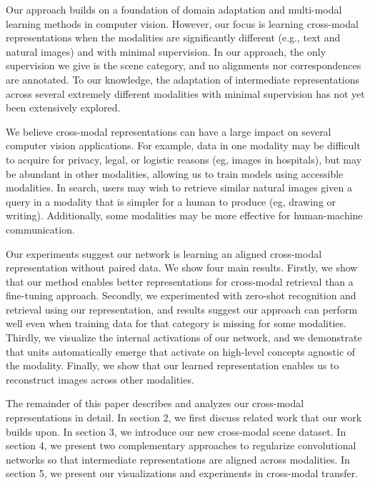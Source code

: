 \documentclass[10pt,journal,compsoc]{IEEEtran}
\begin{document}
    Our approach builds on a foundation of domain adaptation \cite{saenko2010adapting,gopalan2011domain} and multi-modal learning \cite{frome2013devise,norouzi2013zero,socher2013zero} methods in computer vision. However, our focus is learning cross-modal representations when the modalities are significantly different (e.g., text and natural images) and with minimal supervision. In our approach, the only supervision we give is the scene category, and no alignments nor correspondences are annotated. To our knowledge, the adaptation of intermediate representations across several extremely different modalities with minimal supervision has not yet been extensively explored.
    
    We believe cross-modal representations can have a large impact on several computer vision applications.  For example, data in one modality may be difficult to acquire for privacy, legal, or logistic reasons (eg, images in hospitals), but may be abundant in other modalities, allowing us to train models using accessible modalities. In search, users may wish to retrieve similar natural images given a query in a modality that is simpler for a human to produce (eg, drawing or writing). Additionally, some modalities may be more effective for human-machine communication. 
    
    Our experiments suggest our network is learning an aligned cross-modal representation without paired data. We show four main results. Firstly, we show that our method enables better representations for cross-modal retrieval than a fine-tuning approach. Secondly, we experimented with zero-shot recognition and retrieval using our representation, and results suggest our approach can perform well even when training data for that category is missing for some modalities. Thirdly, we visualize the internal activations of our network, and we demonstrate that units automatically emerge that activate on high-level concepts agnostic of the modality. Finally, we show that our learned representation enables us to reconstruct images across other modalities. 
 
    The remainder of this paper describes and analyzes our cross-modal representations in detail. In section 2, we first discuss related work that our work builds upon. In section 3, we introduce our new cross-modal scene dataset. In section 4, we present two complementary approaches to regularize convolutional networks so that intermediate representations are aligned across modalities. In section 5, we present our visualizations and experiments in cross-modal transfer. 
\end{document}
